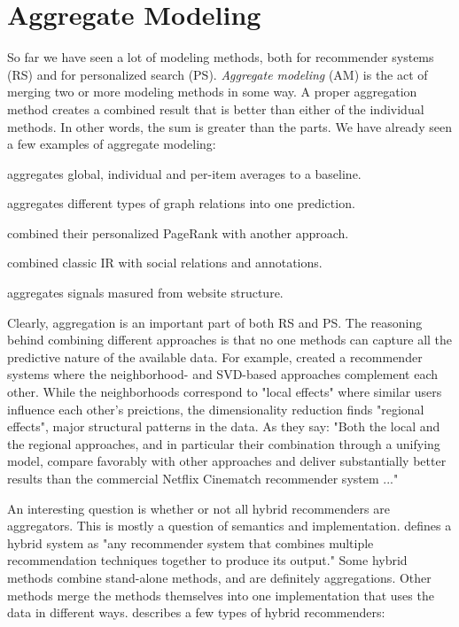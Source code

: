 \section{Aggregate Modeling}
\label{sec:aggregate}

So far we have seen a lot of modeling methods, both for recommender systems (RS) and for personalized search (PS).
\emph{Aggregate modeling} (AM) is the act of merging two or more modeling methods in some way.
A proper aggregation method creates a combined result that is better than either of the individual methods.
In other words, the sum is greater than the parts.
We have already seen a few examples of aggregate modeling:

\begin{itemize*}
  \item \cite{Koren2008} aggregates global, individual and per-item averages to a baseline.
  \item \cite{Huang2002} aggregates different types of graph relations into one prediction.
  \item \citet{Haveliwala2003} combined their personalized PageRank with another approach.
  \item \cite{Carmel2009} combined classic IR with social relations and annotations.
  \item \citet[p5]{Bender2005} aggregates signals masured from website structure.
\end{itemize*}

Clearly, aggregation is an important part of both RS and PS.
The reasoning behind combining different approaches is that no one methods
can capture all the predictive nature of the available data.
For example, 
\cite{Bell2007b} created a recommender systems where the neighborhood- and SVD-based approaches complement each other.
While the neighborhoods correspond to "local effects" where similar users influence each other's preictions,
the dimensionality reduction finds "regional effects", major structural patterns in the data.
As they say: 
"Both the local and the regional approaches, and in particular their combination through a unifying model, 
compare favorably with other approaches and deliver substantially better results than the 
commercial Netflix Cinematch recommender system ..."
\cite[p1]{Bell2007b}

An interesting question is whether or not all hybrid recommenders are aggregators. 
This is mostly a question of semantics and implementation.
\citet[p4]{Burke2007} defines a hybrid system as "any recommender system that combines multiple recommendation techniques together to produce its output."
Some hybrid methods combine stand-alone methods, and are definitely aggregations.
Other methods merge the methods themselves into one implementation that uses the data in different ways.
\citeauthor{Burke2007} describes a few types of hybrid recommenders:

